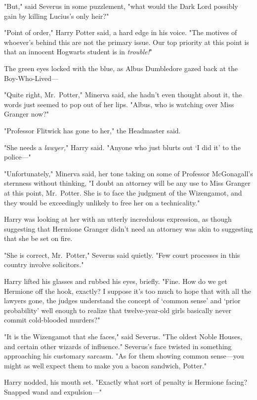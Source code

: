 "But," said Severus in some puzzlement, "what would the Dark Lord possibly gain
by killing Lucius's only heir?"

"Point of order," Harry Potter said, a hard edge in his voice. "The motives of
whoever's behind this are not the primary issue. Our top priority at this point
is that an innocent Hogwarts student is in \emph{trouble!}"

The green eyes locked with the blue, as Albus Dumbledore gazed back at the
Boy-Who-Lived\mbox{---}

"Quite right, Mr.~Potter," Minerva said, she hadn't even thought about it, the
words just seemed to pop out of her lips. "Albus, who is watching over Miss
Granger now?"

"Professor Flitwick has gone to her," the Headmaster said.

"She needs a \emph{lawyer,}" Harry said. "Anyone who just blurts out `I did it'
to the police\mbox{---}"

"Unfortunately," Minerva said, her tone taking on some of Professor
McGonagall's sternness without thinking, "I doubt an attorney will be any use
to Miss Granger at this point, Mr.~Potter. She is to face the judgment of the
Wizengamot, and they would be exceedingly unlikely to free her on a
technicality."

Harry was looking at her with an utterly incredulous expression, as though
suggesting that Hermione Granger didn't need an attorney was akin to suggesting
that she be set on fire.

"She is correct, Mr.~Potter," Severus said quietly. "Few court processes in
this country involve solicitors."

Harry lifted his glasses and rubbed his eyes, briefly. "Fine. How do we get
Hermione off the hook, exactly? I suppose it's too much to hope that with all
the lawyers gone, the judges understand the concept of `common sense' and
`prior probability' well enough to realize that twelve-year-old girls basically
never commit cold-blooded murders?"

"It is the Wizengamot that she faces," said Severus. "The oldest Noble Houses,
and certain other wizards of influence." Severus's face twisted in something
approaching his customary sarcasm. "As for them showing common sense---you
might as well expect them to make you a bacon sandwich, Potter."

Harry nodded, his mouth set. "Exactly what sort of penalty is Hermione facing?
Snapped wand and expulsion\mbox{---}"

